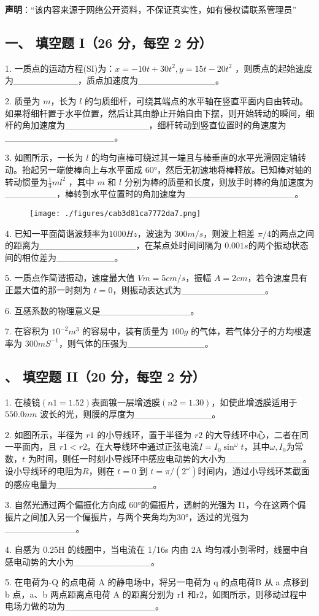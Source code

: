 
\textbf{声明}：“该内容来源于网络公开资料，不保证真实性，如有侵权请联系管理员”

\subsection{一、 填空题 I（26 分，每空 2 分）}
1. 一质点的运动方程(SI)为：$x=-10t+30t^2,y=15t-20t^2$ ，则质点的起始速度为__________，质点加速度为____________。

2. 质量为 $m$，长为 $l$ 的匀质细杆，可绕其端点的水平轴在竖直平面内自由转动。如果将细杆置于水平位置，然后让其由静止开始自由下摆，则开始转动的瞬间，细杆的角加速度为_____________，细杆转动到竖直位置时的角速度为_________________。

3. 如图所示，一长为 $l$ 的均匀直棒可绕过其一端且与棒垂直的水平光滑固定轴转动。抬起另一端使棒向上与水平面成 60°，然后无初速地将棒释放。已知棒对轴的转动惯量为$\frac{1}{3}ml^2$ ，其中 $m$ 和 $l$ 分别为棒的质量和长度，则放手时棒的角加速度为________，棒转到水平位置时的角加速度为_________________。
\begin{figure}[ht]
\centering
\texttt{[image: ./figures/cab3d81ca7772da7.png]}
\caption{} \label{fig_NJUD3_1}
\end{figure}
4. 已知一平面简谐波频率为$1000Hz$，波速为 $300m/s$，则波上相差 $\pi/4$的两点之间的距离为_______________，在某点处时间间隔为 $0.001s$的两个振动状态间的相位差为_________。

5. 一质点作简谐振动，速度最大值 $Vm=5cm/s$，振幅 $A=2cm$，若令速度具有正最大值的那一时刻为 $t=0$，则振动表达式为_____________。

6. 互感系数的物理意义是______________。

7. 在容积为 $10^{-2}m^3$ 的容易中，装有质量为 $100g$ 的气体，若气体分子的方均根速率为 $300mS^{-1}$，则气体的压强为____________。
\subsection{、 填空题 II（20 分，每空 2 分）}
1. 在棱镜$(n1=1.52)$表面镀一层增透膜$(n2=1.30)$，如使此增透膜适用于 $550.0nm$ 波长的光，则膜的厚度为____________。

2. 如图所示，半径为 $r1$ 的小导线环，置于半径为 $r2$ 的大导线环中心，二者在同一平面内，且 $r1<r2$。在大导线环中通过正弦电流$I=I_0\sin^\omega t$，其中$\omega ,I_0$为常数，$t$ 为时间，则任一时刻小导线环中感应电动势的大小为____________。设小导线环的电阻为$R$，则在 $t=0$ 到 $t=\pi/(2^\omega )$时间内，通过小导线环某截面的感应电量为_______________。

3. 自然光通过两个偏振化方向成 60°的偏振片，透射的光强为 I1，今在这两个偏振片之间加入另一个偏振片，与两个夹角均为30°，透过的光强为___________。

4. 自感为 0.25H 的线圈中，当电流在 1/16s 内由 2A 均匀减小到零时，线圈中自感电动势的大小为____________。

5. 在电荷为-Q 的点电荷 A 的静电场中，将另一电荷为 q 的点电荷B 从 a 点移到 b 点，a、b 两点距离点电荷 A 的距离分别为 r1 和r2，如图所示，则移动过程中电场力做的功为______________。
